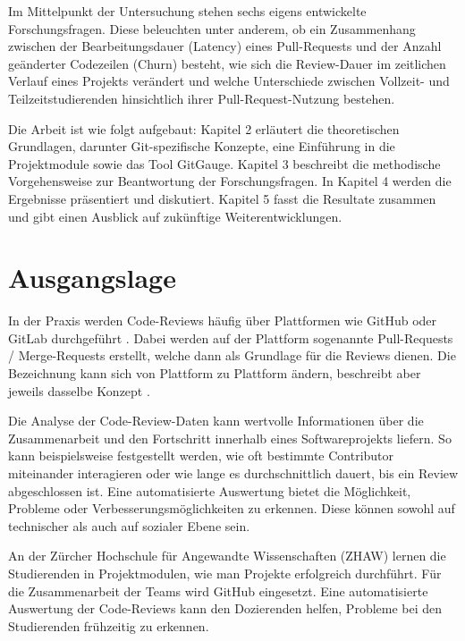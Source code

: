 Im Mittelpunkt der Untersuchung stehen sechs eigens entwickelte Forschungsfragen. Diese beleuchten unter anderem, ob ein Zusammenhang zwischen der Bearbeitungsdauer (Latency) eines Pull-Requests und der Anzahl geänderter Codezeilen (Churn) besteht, wie sich die Review-Dauer im zeitlichen Verlauf eines Projekts verändert und welche Unterschiede zwischen Vollzeit- und Teilzeitstudierenden hinsichtlich ihrer Pull-Request-Nutzung bestehen.

Die Arbeit ist wie folgt aufgebaut: Kapitel 2 erläutert die theoretischen Grundlagen, darunter Git-spezifische Konzepte, eine Einführung in die Projektmodule sowie das Tool GitGauge. Kapitel 3 beschreibt die methodische Vorgehensweise zur Beantwortung der Forschungsfragen. In Kapitel 4 werden die Ergebnisse präsentiert und diskutiert. Kapitel 5 fasst die Resultate zusammen und gibt einen Ausblick auf zukünftige Weiterentwicklungen.



\label{Chapter1} %


\section{Ausgangslage}
\label{sec:Ausgangslage} 
In der Praxis werden Code-Reviews häufig über Plattformen wie GitHub oder GitLab durchgeführt \parencite{noauthor_team_nodate}. Dabei werden auf der Plattform sogenannte Pull-Requests / Merge-Requests erstellt, welche dann als Grundlage für die Reviews dienen. Die Bezeichnung kann sich von Plattform zu Plattform ändern, beschreibt aber jeweils dasselbe Konzept \parencite{kansab_analyzing_2025}.


Die Analyse der Code-Review-Daten kann wertvolle Informationen über die Zusammenarbeit und den Fortschritt innerhalb eines Softwareprojekts liefern. So kann beispielsweise festgestellt werden, wie oft bestimmte Contributor miteinander interagieren oder wie lange es durchschnittlich dauert, bis ein Review abgeschlossen ist. Eine automatisierte Auswertung bietet die Möglichkeit, Probleme oder Verbesserungsmöglichkeiten zu erkennen. Diese können sowohl auf technischer als auch auf sozialer Ebene sein. 

An der Zürcher Hochschule für Angewandte Wissenschaften (ZHAW) lernen die Studierenden in Projektmodulen, wie man Projekte erfolgreich durchführt. Für die Zusammenarbeit der Teams wird GitHub eingesetzt. Eine automatisierte Auswertung der Code-Reviews kann den Dozierenden helfen, Probleme bei den Studierenden frühzeitig zu erkennen.

